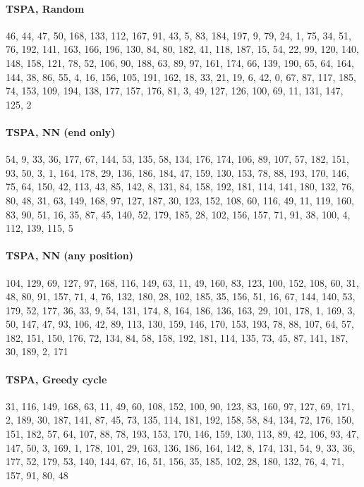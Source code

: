 \paragraph{TSPA, Random}
{\footnotesize\ttfamily\raggedright 46, 44, 47, 50, 168, 133, 112, 167, 91, 43, 5, 83, 184, 197, 9, 79, 24, 1, 75, 34, 51, 76, 192, 141, 163, 166, 196, 130, 84, 80, 182, 41, 118, 187, 15, 54, 22, 99, 120, 140, 148, 158, 121, 78, 52, 106, 90, 188, 63, 89, 97, 161, 174, 66, 139, 190, 65, 64, 164, 144, 38, 86, 55, 4, 16, 156, 105, 191, 162, 18, 33, 21, 19, 6, 42, 0, 67, 87, 117, 185, 74, 153, 109, 194, 138, 177, 157, 176, 81, 3, 49, 127, 126, 100, 69, 11, 131, 147, 125, 2\par}

\paragraph{TSPA, NN (end only)}
{\footnotesize\ttfamily\raggedright 54, 9, 33, 36, 177, 67, 144, 53, 135, 58, 134, 176, 174, 106, 89, 107, 57, 182, 151, 93, 50, 3, 1, 164, 178, 29, 136, 186, 184, 47, 159, 130, 153, 78, 88, 193, 170, 146, 75, 64, 150, 42, 113, 43, 85, 142, 8, 131, 84, 158, 192, 181, 114, 141, 180, 132, 76, 80, 48, 31, 63, 149, 168, 97, 127, 187, 30, 123, 152, 108, 60, 116, 49, 11, 119, 160, 83, 90, 51, 16, 35, 87, 45, 140, 52, 179, 185, 28, 102, 156, 157, 71, 91, 38, 100, 4, 112, 139, 115, 5\par}

\paragraph{TSPA, NN (any position)}
{\footnotesize\ttfamily\raggedright 104, 129, 69, 127, 97, 168, 116, 149, 63, 11, 49, 160, 83, 123, 100, 152, 108, 60, 31, 48, 80, 91, 157, 71, 4, 76, 132, 180, 28, 102, 185, 35, 156, 51, 16, 67, 144, 140, 53, 179, 52, 177, 36, 33, 9, 54, 131, 174, 8, 164, 186, 136, 163, 29, 101, 178, 1, 169, 3, 50, 147, 47, 93, 106, 42, 89, 113, 130, 159, 146, 170, 153, 193, 78, 88, 107, 64, 57, 182, 151, 150, 176, 72, 134, 84, 58, 158, 192, 181, 114, 135, 73, 45, 87, 141, 187, 30, 189, 2, 171\par}

\paragraph{TSPA, Greedy cycle}
{\footnotesize\ttfamily\raggedright 31, 116, 149, 168, 63, 11, 49, 60, 108, 152, 100, 90, 123, 83, 160, 97, 127, 69, 171, 2, 189, 30, 187, 141, 87, 45, 73, 135, 114, 181, 192, 158, 58, 84, 134, 72, 176, 150, 151, 182, 57, 64, 107, 88, 78, 193, 153, 170, 146, 159, 130, 113, 89, 42, 106, 93, 47, 147, 50, 3, 169, 1, 178, 101, 29, 163, 136, 186, 164, 142, 8, 174, 131, 54, 9, 33, 36, 177, 52, 179, 53, 140, 144, 67, 16, 51, 156, 35, 185, 102, 28, 180, 132, 76, 4, 71, 157, 91, 80, 48\par}

